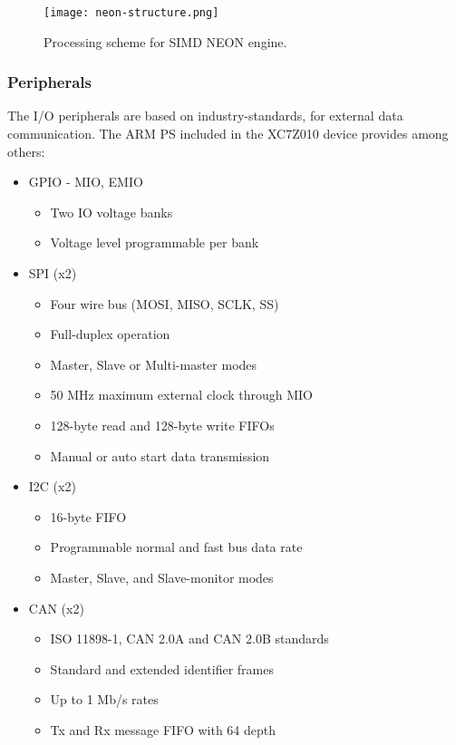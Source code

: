 \begin{figure}[htp]
	\centering
	\texttt{[image: neon-structure.png]}
	\caption{Processing scheme for SIMD NEON engine.} \label{fig:neon-structure}
\end{figure}

\subsubsection{Peripherals}

The I/O peripherals are based on industry-standards, for external data communication. The ARM PS included in the XC7Z010 device provides among others:

\begin{itemize}
	\item GPIO - MIO, EMIO
	\begin{itemize}
		\item Two IO voltage banks
		\item Voltage level programmable per bank
	\end{itemize}
	\item SPI (x2)
	\begin{itemize}
		\item Four wire bus (MOSI, MISO, SCLK, SS)
		\item Full-duplex operation
		\item Master, Slave or Multi-master modes
		\item 50 MHz maximum external clock through MIO
		\item 128-byte read and 128-byte write FIFOs
		\item Manual or auto start data transmission
	\end{itemize}
	\item I2C (x2)
	\begin{itemize}
		\item 16-byte FIFO
		\item Programmable normal and fast bus data rate
		\item Master, Slave, and Slave-monitor modes
	\end{itemize}
	\item CAN (x2)
	\begin{itemize}
		\item ISO 11898-1, CAN 2.0A and CAN 2.0B standards
		\item Standard and extended identifier frames
		\item Up to 1 Mb/s rates
		\item Tx and Rx message FIFO with 64 depth

\end{itemize}
\end{itemize}
